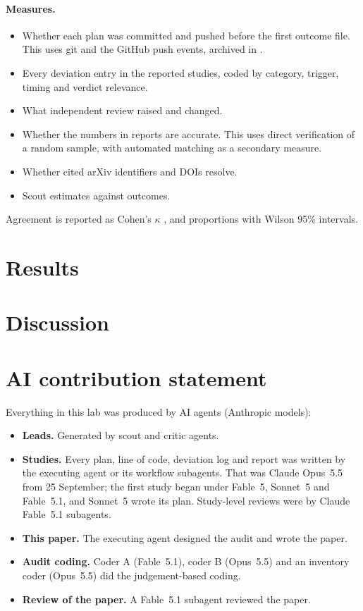 \documentclass[11pt]{article}
\begin{document}
\paragraph{Measures.}
\begin{itemize}
\item[(A)] Whether each plan was committed and pushed before the first outcome file. This uses git and the GitHub push
events, archived in .
\item[(B)] Every deviation entry in the reported studies, coded by category, trigger, timing and verdict relevance.
\item[(C)] What independent review raised and changed.
\item[(D)] Whether the numbers in reports are accurate. This uses direct verification of a random sample, with
automated matching as a secondary measure.
\item[(E)] Whether cited arXiv identifiers and DOIs resolve.
\item[(F)] Scout estimates against outcomes.
\end{itemize}
Agreement is reported as Cohen's $\kappa$ \citep{cohen1960kappa}, and proportions with Wilson 95\% intervals.

\section{Results}
\label{sec:results}


\section{Discussion}
\label{sec:discussion}


\section*{AI contribution statement}

Everything in this lab was produced by AI agents (Anthropic models):
\begin{itemize}
\item \textbf{Leads.} Generated by scout and critic agents.
\item \textbf{Studies.} Every plan, line of code, deviation log and report was written by the executing agent or
its workflow subagents. That was Claude Opus~5.5 from 25 September; the first study began under Fable~5, Sonnet~5 and
Fable~5.1, and Sonnet~5 wrote its plan. Study-level reviews were by Claude Fable~5.1 subagents.
\item \textbf{This paper.} The executing agent designed the audit and wrote the paper.
\item \textbf{Audit coding.} Coder A (Fable~5.1), coder B (Opus~5.5) and an inventory coder (Opus~5.5) did the
judgement-based coding.
\item \textbf{Review of the paper.} A Fable~5.1 subagent reviewed the paper.
\end{itemize}
\end{document}
